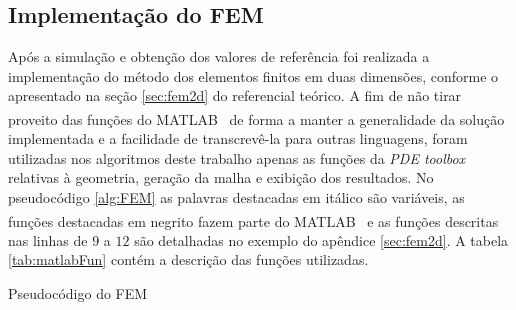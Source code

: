 \documentclass[
    12pt,               %
    openright,          %
    oneside,
    a4paper,            %
    english,            %
    french,             %
    spanish,            %
    brazil              %
    ]{abntex2}
\newcommand{\matlab}{MATLAB\textsuperscript{\textregistered} \ }
\begin{document}
\subsection{Implementação do FEM}
Após a simulação e obtenção dos valores de referência foi realizada a implementação do método dos elementos finitos em duas dimensões, conforme o apresentado na seção \ref{sec:fem2d} do referencial teórico.
A fim de não tirar proveito das funções do \matlab de forma a manter a generalidade da solução implementada e a facilidade de transcrevê-la para outras linguagens, foram utilizadas nos algoritmos deste trabalho apenas as funções da \textit{PDE toolbox} relativas à geometria, geração da malha e exibição dos resultados. No pseudocódigo \ref{alg:FEM} as palavras destacadas em itálico são variáveis, as funções destacadas em negrito fazem parte do \matlab e as funções descritas nas linhas de $9$ a $12$ são detalhadas no exemplo do apêndice \ref{sec:fem2d}. A tabela \ref{tab:matlabFun} contém a descrição das funções utilizadas.

\begin{algorithm}	
	\caption{\label{alg:FEM}Pseudocódigo do FEM} 
	\begin{algorithmic}[1]
	\end{algorithmic}
\end{algorithm}
\end{document}
